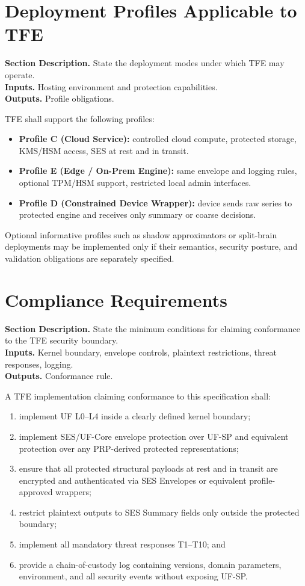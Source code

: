 \documentclass[11pt]{report}
\newcommand{\meta}[3]{\textbf{Section Description.} #1\\
\textbf{Inputs.} #2\\
\textbf{Outputs.} #3\par}
\begin{document}
\section{Deployment Profiles Applicable to TFE}
\meta{State the deployment modes under which TFE may operate.}{Hosting environment and protection capabilities.}{Profile obligations.}

TFE shall support the following profiles:
\begin{itemize}
    \item \textbf{Profile C (Cloud Service):} controlled cloud compute, protected storage, KMS/HSM access, SES at rest and in transit.
    \item \textbf{Profile E (Edge / On-Prem Engine):} same envelope and logging rules, optional TPM/HSM support, restricted local admin interfaces.
    \item \textbf{Profile D (Constrained Device Wrapper):} device sends raw series to protected engine and receives only summary or coarse decisions.
\end{itemize}

Optional informative profiles such as shadow approximators or split-brain deployments may be implemented only if their semantics, security posture, and validation obligations are separately specified.

\section{Compliance Requirements}
\meta{State the minimum conditions for claiming conformance to the TFE security boundary.}{Kernel boundary, envelope controls, plaintext restrictions, threat responses, logging.}{Conformance rule.}

A TFE implementation claiming conformance to this specification shall:
\begin{enumerate}[leftmargin=1.2cm]
    \item implement UF L0--L4 inside a clearly defined kernel boundary;
    \item implement SES/UF-Core envelope protection over UF-SP and equivalent protection over any PRP-derived protected representations;
    \item ensure that all protected structural payloads at rest and in transit are encrypted and authenticated via SES Envelopes or equivalent profile-approved wrappers;
    \item restrict plaintext outputs to SES Summary fields only outside the protected boundary;
    \item implement all mandatory threat responses T1--T10; and
    \item provide a chain-of-custody log containing versions, domain parameters, environment, and all security events without exposing UF-SP.
\end{enumerate}
\end{document}
